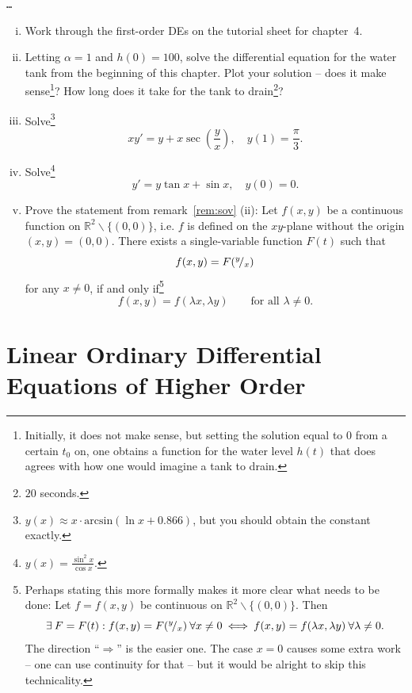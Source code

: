 \begin{application}
\texttt{\ldots}
\end{application}

\begin{exercise}
\begin{enumerate}[(i)]
	\item Work through the first-order DEs on the tutorial sheet for chapter~4.
	\item Letting $\alpha=1$ and $h(0)=100$, solve the differential equation for the water tank from the beginning of this chapter. Plot your solution -- does it make sense\footnote{Initially, it does not make sense, but setting the solution equal to $0$ from a certain $t_0$ on, one obtains a function for the water level $h(t)$ that does agrees with how one would imagine a tank to drain.}? How long does it take for the tank to drain\footnote{$20$ seconds.}?
	\item Solve\footnote{$y(x) \approx x \cdot \text{arcsin} ( \ln x + 0.866 )$,
	but you should obtain the constant exactly.}
	\[ xy'=y+x\sec\left(\frac{y}{x}\right), \quad y(1)=\frac{\pi}{3}.\]
	\item Solve\footnote{$y(x)=\frac{\sin^2x}{\cos x}$.}
	\[ y' = y \tan x + \sin x, \quad y(0)=0. \]
	\item Prove the statement from remark~\ref{rem:sov} (ii): Let $f(x,y)$ be a continuous function on $\mathbb{R}^2\backslash\{(0,0)\}$, i.e. $f$ is defined on the $xy$-plane without the origin $(x,y)=(0,0)$. There exists a single-variable function $F(t)$ such that 
	\[ f(x,y)=F({}^{y}\!/_{x}) \]
	for any $x\not=0$, if and only if\footnote{Perhaps stating this more formally makes it more clear what needs to be done: Let $f=f(x,y)$ be continuous on $\mathbb{R}^2\backslash\{(0,0)\}$. Then
	\[ \exists \: F=F(t): f(x,y)=F({}^{y}\!/_{x}) \: \forall x\not=0
	\: \Longleftrightarrow \: f(x,y)=f(\lambda x, \lambda y) \: \forall \lambda\not=0.
	\] The direction ``$\Longrightarrow$'' is the easier one. The case $x=0$ causes some extra work -- one can use continuity for that -- but it would be alright to skip this technicality.}
	\[ f(x,y) = f(\lambda x, \lambda y) \qquad \text{for all~}\lambda\not=0.\]
\end{enumerate}
\end{exercise}


\section{Linear Ordinary Differential Equations of Higher Order}
\label{sec:s-o}

